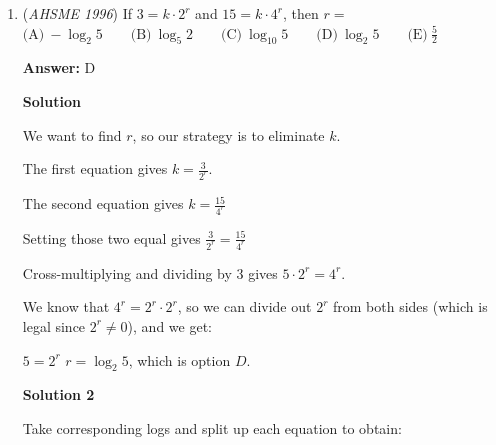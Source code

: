 \begin{enumerate}
 $\text{(A)}\ 1\qquad\text{(B)}\ 2\qquad\text{(C)}\ 3\qquad\text{(D)}\ 4\qquad\text{(E)}\ 5$

 \textbf{Answer: }B



\textbf{Solution}

The bill for the three children is $9.45 - 4.95 = 4.50$.  Since the charge is $0.45$ per year for the children, they must have $\frac{4.50}{0.45} = 10$ years among the three of them.

 The twins must have an even number of years in total (presuming that they did not dine in the 17 minutes between the time when the first twin was born and the second twin was born).  If we let the twins be $5$ years old, that leaves $10 - 2\cdot 5 = 0$ years leftover for the youngest child.  But if the twins are each $4$ years old, then the youngest child could be $10 - 2\cdot 4 = 2$ years old, which is choice $\boxed{B}$.

 Of note, this is the only possibility for the ages of the children.  If the twins were $3$ years old, the "younger" child would be $10 - 2\cdot 3 = 4$ years old.

 


	\item (\textit{AHSME 1996}) If $3 = k\cdot 2^r$ and $15 = k\cdot 4^r$, then $r =$
$\text{(A)}\ -\log_{2}5\qquad\text{(B)}\ \log_{5}2\qquad\text{(C)}\ \log_{10}5\qquad\text{(D)}\ \log_{2}5\qquad\text{(E)}\ \frac{5}{2}$

 \textbf{Answer: }D



\textbf{Solution}

We want to find $r$, so our strategy is to eliminate $k$.

 The first equation gives $k = \frac{3}{2^r}$.

 The second equation gives $k = \frac{15}{4^r}$

 Setting those two equal gives $\frac{3}{2^r} = \frac{15}{4^r}$

 Cross-multiplying and dividing by $3$ gives $5\cdot 2^r = 4^r$.

 We know that $4^r = 2^r \cdot 2^r$, so we can divide out $2^r$ from both sides (which is legal since $2^r \neq 0$), and we get:

 $5 = 2^r$
$r = \log_2 5$, which is option $\boxed{D}$.

 



\textbf{Solution 2}

Take corresponding logs and split up each equation to obtain:


\end{enumerate}
